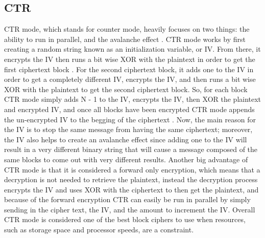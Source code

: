 \documentclass[a4paper, 10pt, draftclsnofoot, onecolumn]{article}
\begin{document}
\subsection*{CTR}
CTR mode, which stands for counter mode, heavily focuses on two things: the ability to run in parallel, and the avalanche effect \cite{ciphers}. CTR mode works by first creating a random string known as an initialization variable, or IV. From there, it encrypts the IV then runs a bit wise XOR with the plaintext in order to get the first ciphertext block \cite{ciphers}. For the second ciphertext block, it adds one to the IV in order to get a completely different IV, encrypts the IV, and then runs a bit wise XOR with the plaintext to get the second ciphertext block. So, for each block CTR mode simply adds N - 1 to the IV, encrypts the IV, then XOR the plaintext and encrypted IV, and once all blocks have been encrypted CTR mode appends the un-encrypted IV to the begging of the ciphertext \cite{ciphers}. Now, the main reason for the IV is to stop the same message from having the same ciphertext; moreover, the IV also helps to create an avalanche effect since adding one to the IV will result in a very different binary string that will cause a message composed of the same blocks to come out with very different results. Another big advantage of CTR mode is that it is considered a forward only encryption, which means that a decryption is not needed to retrieve the plaintext, instead the decryption process encrypts the IV and uses XOR with the ciphertext to then get the plaintext, and because of the forward encryption CTR can easily be run in parallel by simply sending in the cipher text, the IV, and the amount to increment the IV. Overall CTR mode is considered one of the best block ciphers to use when resources, such as storage space and processor speeds, are a constraint.
\end{document}
